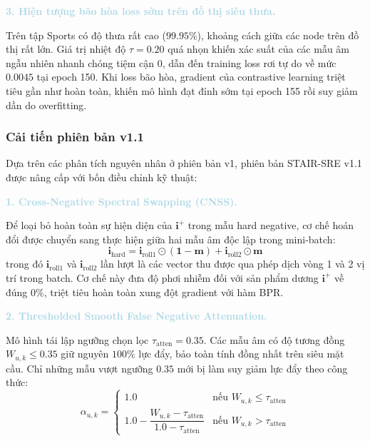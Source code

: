 \noindent\textcolor{lightblue}{\textbf{3. Hiện tượng bão hòa loss sớm trên đồ thị siêu thưa.}}

Trên tập Sports có độ thưa rất cao ($99.95\%$), khoảng cách giữa các node trên đồ thị rất lớn. Giá trị nhiệt độ $\tau = 0.20$ quá nhọn khiến xác suất của các mẫu âm ngẫu nhiên nhanh chóng tiệm cận 0, dẫn đến training loss rơi tự do về mức $0.0045$ tại epoch 150. Khi loss bão hòa, gradient của contrastive learning triệt tiêu gần như hoàn toàn, khiến mô hình đạt đỉnh sớm tại epoch 155 rồi suy giảm dần do overfitting.

\subsubsection{Cải tiến phiên bản v1.1}

Dựa trên các phân tích nguyên nhân ở phiên bản v1, phiên bản STAIR-SRE v1.1 được nâng cấp với bốn điều chỉnh kỹ thuật:

\noindent\textcolor{lightblue}{\textbf{1. Cross-Negative Spectral Swapping (CNSS).}}

Để loại bỏ hoàn toàn sự hiện diện của $\mathbf{i}^+$ trong mẫu hard negative, cơ chế hoán đổi được chuyển sang thực hiện giữa hai mẫu âm độc lập trong mini-batch:
\begin{equation}
\mathbf{i}_{\text{hard}} = \mathbf{i}_{\text{roll1}} \odot (\mathbf{1} - \mathbf{m}) + \mathbf{i}_{\text{roll2}} \odot \mathbf{m}
\end{equation}
trong đó $\mathbf{i}_{\text{roll1}}$ và $\mathbf{i}_{\text{roll2}}$ lần lượt là các vector thu được qua phép dịch vòng 1 và 2 vị trí trong batch. Cơ chế này đưa độ phơi nhiễm đối với sản phẩm dương $\mathbf{i}^+$ về đúng 0\%, triệt tiêu hoàn toàn xung đột gradient với hàm BPR.

\noindent\textcolor{lightblue}{\textbf{2. Thresholded Smooth False Negative Attenuation.}}

Mô hình tái lập ngưỡng chọn lọc $\tau_{\text{atten}} = 0.35$. Các mẫu âm có độ tương đồng $W_{u, k} \le 0.35$ giữ nguyên $100\%$ lực đẩy, bảo toàn tính đồng nhất trên siêu mặt cầu. Chỉ những mẫu vượt ngưỡng $0.35$ mới bị làm suy giảm lực đẩy theo công thức:
\begin{equation}
\alpha_{u, k} = \begin{cases} 
1.0 & \text{nếu } W_{u, k} \le \tau_{\text{atten}} \\ 
1.0 - \dfrac{W_{u, k} - \tau_{\text{atten}}}{1.0 - \tau_{\text{atten}}} & \text{nếu } W_{u, k} > \tau_{\text{atten}} 
\end{cases}
\end{equation}


